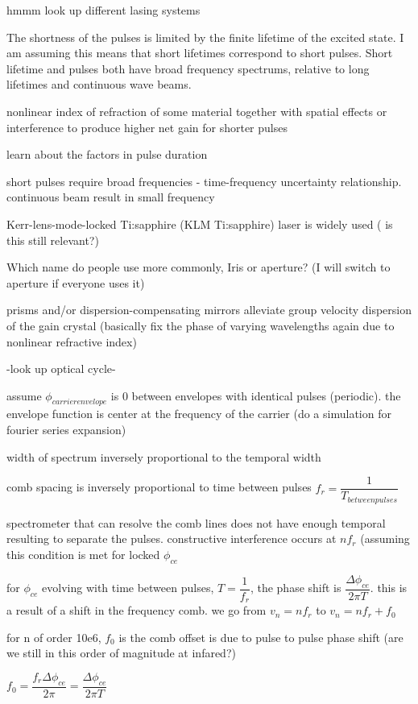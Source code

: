 \documentclass[11pt,a4paper]{book}
\begin{document}
hmmm look up different lasing systems

The shortness of the pulses is limited by the finite lifetime of the excited state. I am assuming this means that short lifetimes correspond to short pulses. Short lifetime and pulses both have broad frequency spectrums, relative to long lifetimes and continuous wave beams.

nonlinear index of refraction of some material together with spatial effects or interference to produce higher net gain for shorter pulses

learn about the factors in pulse duration

short pulses require broad frequencies - time-frequency uncertainty relationship. continuous beam result in small frequency 

Kerr-lens-mode-locked Ti:sapphire (KLM Ti:sapphire) laser is widely used ( is this still relevant?) 

Which name do people use more commonly, Iris or aperture? (I will switch to aperture if everyone uses it)

prisms and/or dispersion-compensating mirrors alleviate group velocity dispersion of the gain crystal (basically fix the phase of varying wavelengths again due to nonlinear refractive index)

-look up optical cycle-

assume $\phi_{carrier envelope}$ is 0 between envelopes with identical pulses (periodic). the envelope function is center at the frequency of the carrier (do a simulation for fourier series expansion)

width of spectrum inversely proportional to the temporal width

comb spacing is inversely proportional to time between pulses $f_r = \dfrac{1}{T_{between pulses}}$

spectrometer that can resolve the comb lines does not have enough temporal resulting to separate the pulses. constructive interference occurs at $nf_r$ (assuming this condition is met for locked $\phi_{ce}$

for $\phi_{ce}$ evolving with time between pulses, $T=\dfrac{1}{f_r}$, the phase shift is  $\dfrac{\Delta \phi_{ce}}{2 \pi T}$. this is a result of a shift in the frequency comb. we go from $v_n = nf_r$ to $v_n=nf_r +f_0$

for n of order 10e6, $f_0$ is the comb offset is due to pulse to pulse phase shift (are we still in this order of magnitude at infared?)

$f_0 = \dfrac{f_r \Delta \phi_{ce}}{2\pi}= \dfrac{\Delta \phi_{ce}}{2\pi T}$
\end{document}
